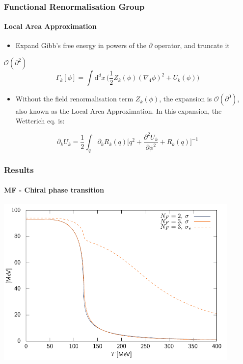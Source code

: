 \documentclass[10pt,a4paper,usenames,dvipsnames]{beamer}
\begin{document}
\begin{frame}
  \frametitle{Functional Renormalisation Group}
  \framesubtitle{Local Area Approximation}

  \begin{itemize}
    \item Expand Gibb's free energy in powers of the $\partial$ operator, and truncate it
  \end{itemize}

  \begin{block}{$\mathcal{O}(\partial^2)$}
    \begin{equation*}
      \Gamma_k[\phi] = \int \mathrm{d}^d x \, \Big( \frac{1}{2}Z_k(\phi)(\nabla_4 \phi)^2 + U_k(\phi) \Big)
    \end{equation*}
  \end{block}

  \begin{itemize}
    \item Without the field renormalisation term $Z_k(\phi)$, the expansion is $\mathcal{O}(\partial^0)$, also known as the Local
      Area Approximation. In this expansion, the Wetterich eq. is:
  \end{itemize}

  \begin{block}{}
    \begin{equation*}
      \partial_k U_k = \frac{1}{2} \int_q \, \partial_k R_k(q) \bigg[ q^2 + \frac{\partial^2 U_k}{\partial\phi^2} +
      R_k(q)\bigg]^{-1}
    \end{equation*}
  \end{block}
\end{frame}

\begin{frame}
  \frametitle{Results}
  \framesubtitle{MF - Chiral phase transition}

  {\centering
    \includegraphics[width=0.9\textwidth]{Plots/mftrans.pdf}
   \par}
\end{frame}
\end{document}
